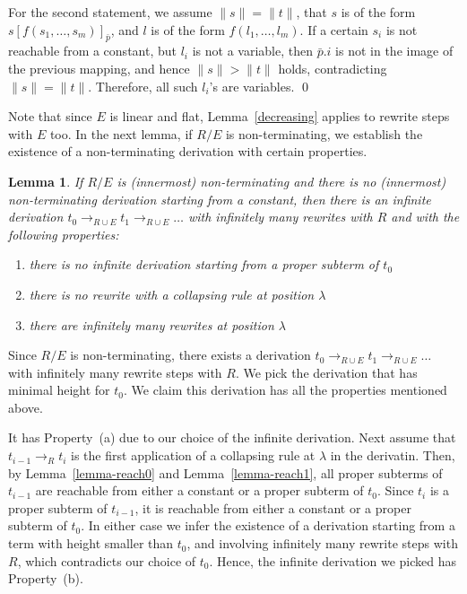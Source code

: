 \documentclass{LMCS}
\theoremstyle{plain}
\newtheorem{lemma}[thm]{Lemma}
\begin{document}
For the second statement,
we assume $\|s\|=\|t\|$, that
$s$ is of the form $s[f(s_1,\ldots,s_m)]_{\bar{p}}$, and $l$ is
of the form $f(l_1,\ldots,l_m)$. If a certain $s_i$ is not
reachable from a constant, but $l_i$ is not a variable, then
$\bar{p}.i$ is not in the image of the previous mapping, and hence
$\|s\|>\|t\|$ holds, contradicting $\|s\|=\|t\|$.
Therefore, all such $l_i$'s are variables.  \qed


Note that since $E$ is linear and flat, Lemma~\ref{decreasing}
applies to rewrite steps with $E$ too.
In the next lemma, if $R/E$ is non-terminating,
we establish the existence of 
a non-terminating derivation with certain properties.

\begin{lemma}\label{lemma-main-aux}
If $R/E$ is (innermost) non-terminating  and
there is no (innermost) non-terminating derivation starting
from a constant, then there is an infinite derivation
$t_0\rightarrow_{R\cup E} t_1\rightarrow_{R\cup E} \ldots$
with infinitely many rewrites with $R$ and
with the following properties:
\begin{enumerate}[\em(a)]
\item there is no infinite derivation starting from a proper
subterm of $t_0$

\item there is no rewrite with a collapsing rule at position $\lambda$

\item there are infinitely many rewrites at position $\lambda$
\end{enumerate}
\end{lemma}
\proof
Since $R/E$ is non-terminating,
there exists a
derivation $t_0\rightarrow_{R\cup E} t_1\rightarrow_{R\cup E} \ldots$
with infinitely many rewrite steps with $R$.
We pick the derivation that has minimal height for $t_0$.
We claim this derivation has all the properties mentioned above.

It has Property~(a) due to our choice of the infinite derivation.
Next assume that 
$t_{i-1}\rightarrow_R t_i$ is the first 
application of a collapsing rule at $\lambda$ in the derivatin.
Then,
by Lemma~\ref{lemma-reach0} and
Lemma~\ref{lemma-reach1}, all proper subterms of $t_{i-1}$ are reachable from either a constant or
a proper subterm of $t_0$. Since $t_i$ is a proper subterm
of $t_{i-1}$, it is reachable from either a constant or
a proper subterm of $t_0$. In either case we infer the existence of
a derivation starting from a term with height smaller
than $t_0$, and involving infinitely many rewrite steps with $R$,
which contradicts our choice of $t_0$.
Hence, the infinite derivation we picked has Property~(b).
\end{document}
